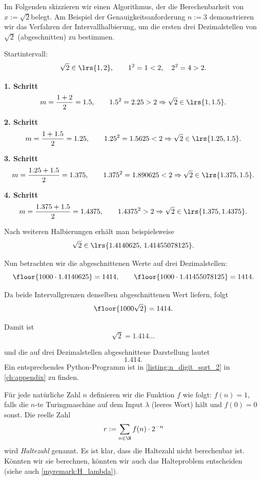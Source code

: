 \begin{myexample}
Im Folgenden skizzieren wir einen Algorithmus, der die Berechenbarkeit von $x:=\sqrt{2}$​ belegt. Am Beispiel der Genauigkeitsanforderung $n:=3$ demonstrieren wir das Verfahren der Intervallhalbierung, um die ersten drei Dezimalstellen von $\sqrt{2}$ (abgeschnitten) zu bestimmen.

Startintervall:
\[
\sqrt{2} \in \lrs{1,2},
\qquad
1^2 = 1 < 2,\quad 2^2 = 4 > 2.
\]

\textbf{1. Schritt}
\[
m=\frac{1+2}{2}=1.5,\qquad 1.5^2=2.25>2 \Rightarrow \sqrt{2}\in\lrs{1,1.5}.
\]

\textbf{2. Schritt}
\[
m=\frac{1+1.5}{2}=1.25,\qquad 1.25^2=1.5625<2 \Rightarrow \sqrt{2}\in\lrs{1.25,1.5}.
\]

\textbf{3. Schritt}
\[
m=\frac{1.25+1.5}{2}=1.375,\qquad 1.375^2=1.890625<2 \Rightarrow \sqrt{2}\in\lrs{1.375,1.5}.
\]

\textbf{4. Schritt}
\[
m=\frac{1.375+1.5}{2}=1.4375,\qquad 1.4375^2>2 \Rightarrow \sqrt{2}\in\lrs{1.375,1.4375}.
\]

Nach weiteren Halbierungen erhält man beispielsweise
\[
\sqrt{2}\in\lrs{1.4140625,\,1.41455078125}.
\]

Nun betrachten wir die abgeschnittenen Werte auf drei Dezimalstellen:
\[
\floor{1000\cdot 1.4140625} = 1414,
\qquad
\floor{1000\cdot 1.41455078125} = 1414.
\]

Da beide Intervallgrenzen denselben abgeschnittenen Wert liefern, folgt
\[
\floor{1000\sqrt{2}} = 1414.
\]

Damit ist
\[
\sqrt{2}=1.414\ldots
\]

und die auf drei Dezimalstellen abgeschnittene Darstellung lautet
\[
1.414.
\]
Ein entsprechendes Python-Programm ist in \cref{listing:n_digit_sqrt_2} in \cref{ch:appendix} zu finden.
\end{myexample}

\begin{myexample}
Für jede natürliche Zahl $n$ definieren wir die Funktion $f$ wie folgt: $f(n) = 1$, falls die $n$-te Turingmaschine auf dem Input $\lambda$ (leeres Wort) hält und $f(0) = 0$ sonst. Die reelle Zahl
\begin{align*}
	r := \sum_{n\in\N}f(n)\cdot 2^{-n}
\end{align*}
wird \emph{Haltezahl} genannt. Es ist klar, dass die Haltezahl nicht berechenbar ist. Könnten wir sie berechnen, könnten wir auch das Halteproblem entscheiden (siehe auch \cref{myremark:H_lambda}).
\end{myexample}